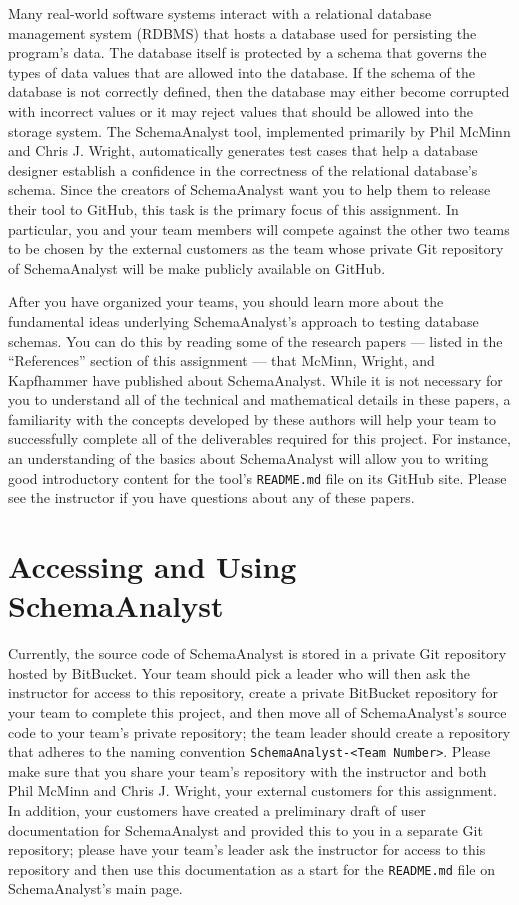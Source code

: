 Many real-world software systems interact with a relational database management system (RDBMS) that hosts a database
used for persisting the program's data. The database itself is protected by a schema that governs the types of data
values that are allowed into the database. If the schema of the database is not correctly defined, then the database may
either become corrupted with incorrect values or it may reject values that should be allowed into the storage system.
The SchemaAnalyst tool, implemented primarily by Phil McMinn and Chris J. Wright, automatically generates test cases
that help a database designer establish a confidence in the correctness of the relational database's schema. Since the
creators of SchemaAnalyst want you to help them to release their tool to GitHub, this task is the primary focus of this
assignment. In particular, you and your team members will compete against the other two teams to be chosen by the
external customers as the team whose private Git repository of SchemaAnalyst will be make publicly available on GitHub.

After you have organized your teams, you should learn more about the fundamental ideas underlying SchemaAnalyst's
approach to testing database schemas. You can do this by reading some of the research papers --- listed in the
``References'' section of this assignment --- that McMinn, Wright, and Kapfhammer have published about SchemaAnalyst.
While it is not necessary for you to understand all of the technical and mathematical details in these papers, a
familiarity with the concepts developed by these authors will help your team to successfully complete all of the
deliverables required for this project. For instance, an understanding of the basics about SchemaAnalyst will allow you
to writing good introductory content for the tool's {\tt README.md} file on its GitHub site. Please see the instructor
if you have questions about any of these papers.

\vspace*{-.05in}
\section*{Accessing and Using SchemaAnalyst}

Currently, the source code of SchemaAnalyst is stored in a private Git repository hosted by BitBucket. Your team should
pick a leader who will then ask the instructor for access to this repository, create a private BitBucket repository for
your team to complete this project, and then move all of SchemaAnalyst's source code to your team's private repository;
the team leader should create a repository that adheres to the naming convention {\tt SchemaAnalyst-<Team Number>}.
Please make sure that you share your team's repository with the instructor and both Phil McMinn and Chris J.  Wright,
your external customers for this assignment. In addition, your customers have created a preliminary draft of user
documentation for SchemaAnalyst and provided this to you in a separate Git repository; please have your team's leader
ask the instructor for access to this repository and then use this documentation as a start for the {\tt README.md} file
on SchemaAnalyst's main page.

